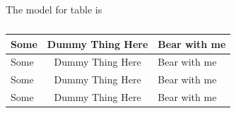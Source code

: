 \documentclass[sansserif,12pt]{style/ShanghaiTech-bachelor-thesis}
\begin{document}
The model for table is 
\begin{table}[htbp] 
 \centering
  \caption{} 
   \begin{tabular}{lcl} 
  	\toprule 
  		Some   & Dummy Thing Here  & Bear with me \\ 
 	\midrule 
 		Some   & Dummy Thing Here  & Bear with me \\ 
 		Some   & Dummy Thing Here  & Bear with me \\ 
 		Some   & Dummy Thing Here  & Bear with me \\ 
  	\bottomrule 
   \end{tabular} 
\end{table}






\end{document}
